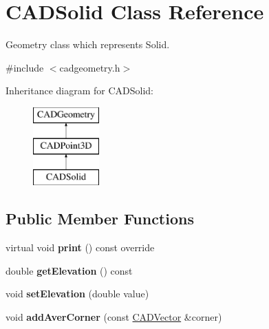 \hypertarget{class_c_a_d_solid}{}\section{C\+A\+D\+Solid Class Reference}
\label{class_c_a_d_solid}


Geometry class which represents Solid.  




{\ttfamily \#include $<$cadgeometry.\+h$>$}

Inheritance diagram for C\+A\+D\+Solid\+:\begin{figure}[H]
\begin{center}
\leavevmode
\includegraphics[height=3.000000cm]{class_c_a_d_solid}
\end{center}
\end{figure}
\subsection*{Public Member Functions}
\begin{DoxyCompactItemize}
\item 
virtual void {\bfseries print} () const  override\hypertarget{class_c_a_d_solid_a0a877a902eaa4ae28a070545873e0b9e}{}\label{class_c_a_d_solid_a0a877a902eaa4ae28a070545873e0b9e}

\item 
double {\bfseries get\+Elevation} () const \hypertarget{class_c_a_d_solid_a727252336a0b3e27d82a3d66e20ec7fa}{}\label{class_c_a_d_solid_a727252336a0b3e27d82a3d66e20ec7fa}

\item 
void {\bfseries set\+Elevation} (double value)\hypertarget{class_c_a_d_solid_ac14f12c8c628f81f774509ebecd9c039}{}\label{class_c_a_d_solid_ac14f12c8c628f81f774509ebecd9c039}

\item 
void {\bfseries add\+Aver\+Corner} (const \hyperlink{class_c_a_d_vector}{C\+A\+D\+Vector} \&corner)\hypertarget{class_c_a_d_solid_aedff85958e4ed364eb034a88877b1f81}{}\label{class_c_a_d_solid_aedff85958e4ed364eb034a88877b1f81}

\end{DoxyCompactItemize}
